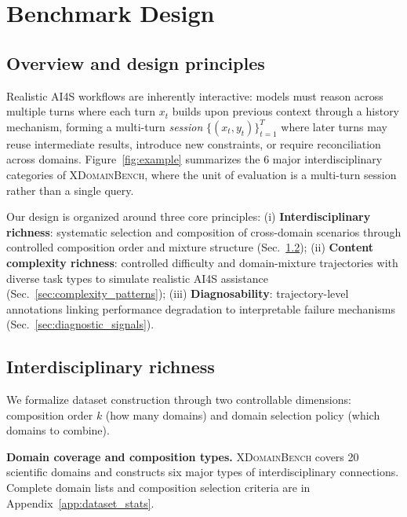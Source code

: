 \section{Benchmark Design}
\label{sec:bench_design}

\subsection{Overview and design principles}
\label{sec:bench_overview}

Realistic AI4S workflows are inherently interactive: models must reason across multiple turns where each turn $x_t$ builds upon previous context through a history mechanism, forming a multi-turn \emph{session} $\{(x_t, y_t)\}_{t=1}^{T}$ where later turns may reuse intermediate results, introduce new constraints, or require reconciliation across domains. Figure~\ref{fig:example} summarizes the 6 major interdisciplinary categories of \textsc{XDomainBench}, where the unit of evaluation is a multi-turn session rather than a single query.

Our design is organized around three core principles: (i) \textbf{Interdisciplinary richness}: systematic selection and composition of cross-domain scenarios through controlled composition order and mixture structure (Sec.~\ref{sec:composition_space}); (ii) \textbf{Content complexity richness}: controlled difficulty and domain-mixture trajectories with diverse task types to simulate realistic AI4S assistance (Sec.~\ref{sec:complexity_patterns}); (iii) \textbf{Diagnosability}: trajectory-level annotations linking performance degradation to interpretable failure mechanisms (Sec.~\ref{sec:diagnostic_signals}).

\subsection{Interdisciplinary richness}
\label{sec:composition_space}

We formalize dataset construction through two controllable dimensions: composition order $k$ (how many domains) and domain selection policy (which domains to combine).

\textbf{Domain coverage and composition types.}
\textsc{XDomainBench} covers 20 scientific domains and constructs six major types of interdisciplinary connections.
Complete domain lists and composition selection criteria are in Appendix~\ref{app:dataset_stats}.

